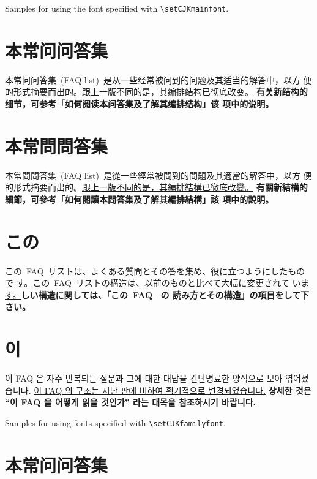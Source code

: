\documentclass[12pt]{article}
\begin{document}
\begin{CJK*}{UTF8}{song}


Samples for using the font specified with \verb|\setCJKmainfont|.

\section{本常问问答集}

本常问问答集~(FAQ list)~是从一些经常被问到的问题及其适当的解答中，以方
便的形式摘要而出的。\uline{跟上一版不同的是，其编排结构已彻底改变。}
\textbf{有关新结构的细节，可参考「如何阅读本问答集及了解其编排结构」该
  项中的说明。}


\section{本常問問答集}

本常問問答集~(FAQ list)~是從一些經常被問到的問題及其適當的解答中，以方
便的形式摘要而出的。\uline{跟上一版不同的是，其編排結構已徹底改變。}
\textbf{有關新結構的細節，可參考「如何閱讀本問答集及了解其編排結構」該
  項中的說明。}


\section{この}

この~FAQ~リストは、よくある質問とその答を集め、役に立つようにしたもので
す。\uline{この~FAQ~リストの構造は、以前のものと比べて大幅に変更されて
  います。}\textbf{しい構造に関しては、「この~FAQ~ の
  読み方とその構造」の項目をして下さい。}


\CJKspace
\section{이}

이 FAQ 은 자주 반복되는 질문과 그에 대한 대답을 간단명료한 양식으로
모아 엮어졌습니다. \uline{이 FAQ 의 구조는 지난 판에 비하여 획기적으로
  변경되었습니다.}  \textbf{상세한 것은 “이 FAQ 을 어떻게 읽을
  것인가” 라는 대목을 참조하시기 바랍니다.}


\newpage


Samples for using fonts specified with \verb|\setCJKfamilyfont|.

\CJKnospace
{}
\section{本常问问答集}


\end{CJK*}
\end{document}
